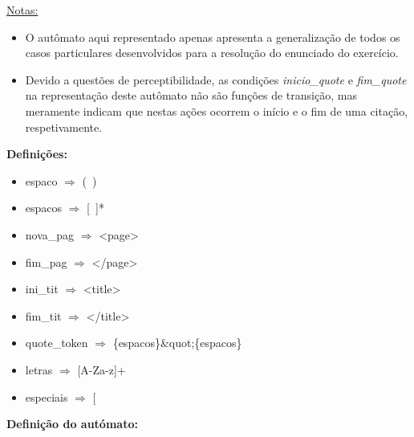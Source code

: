 \documentclass[11pt,a4paper]{report}
\begin{document}
	\vspace{0.5cm}

\underline{Notas:}
\begin{itemize}
	\item O autômato aqui representado apenas apresenta a generalização de todos os casos particulares desenvolvidos para a resolução do enunciado do exercício.
	\item Devido a questões de perceptibilidade, as condições \textit{inicio\_quote} e \textit{fim\_quote} na representação deste autômato não são funções de transição, mas meramente indicam que nestas ações ocorrem o início e o fim de uma citação, respetivamente.
\end{itemize}

\textbf{Definições: }
\begin{itemize}
	\item espaco $\Rightarrow$ (\ )
	\item espacos $\Rightarrow$ [\ ]*
	\item nova\_pag $\Rightarrow$ <page>
	\item fim\_pag $\Rightarrow$ </page>
	\item ini\_tit $\Rightarrow$ <title>
	\item fim\_tit $\Rightarrow$ </title>
	\item quote\_token $\Rightarrow$ \{espacos\}\&quot;\{espacos\}
	\item letras $\Rightarrow$ [A-Za-z]+
	\item especiais $\Rightarrow$ [
\end{itemize}

	\vspace{0.5cm}

\textbf{Definição do autómato:}
\end{document}
